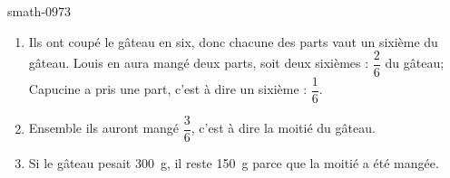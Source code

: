 
\begin{corrige}{smath-0973}

    \begin{enumerate}
        \item
            Ils ont coupé le gâteau en six, donc chacune des parts vaut un sixième du gâteau.
            Louis en aura mangé deux parts, soit deux sixièmes : \( \dfrac{ 2 }{ 6 }\) du gâteau; Capucine a pris une part, c'est à dire un sixième : \( \dfrac{ 1 }{ 6 }\).
        \item
            Ensemble ils auront mangé \( \dfrac{ 3 }{ 6 }\), c'est à dire la moitié du gâteau.
        \item
            Si le gâteau pesait \SI{300}{\gram}, il reste \SI{150}{\gram} parce que la moitié a été mangée.
    \end{enumerate}

\end{corrige}
